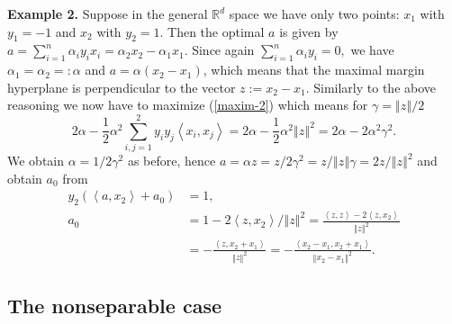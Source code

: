 \documentclass[11pt,twoside]{article}%
\theoremstyle{change}
\begin{document}
\textbf{Example 2.} Suppose in the general $\mathbb{R}^{d}$ space we have only
two points: $x_{1}$ with $y_{1}=-1$ and $x_{2}$ with $y_{2}=1$. Then the
optimal $a$ is given by $a=\sum_{i=1}^{n}\alpha_{i}y_{i}x_{i}=\alpha_{2}%
x_{2}-\alpha_{1}x_{1}$. Since again $\sum_{i=1}^{n}\alpha_{i}y_{i}=0,$ we have
$\alpha_{1}=\alpha_{2}=:\alpha$ and $a=\alpha\left(  x_{2}-x_{1}\right)  $,
which means that the maximal margin hyperplane is perpendicular to the vector
$z:=x_{2}-x_{1}$. Similarly to the above reasoning we now have to maximize
(\ref{maxim-2}) which means for $\gamma=\left\Vert z\right\Vert /2$
\[
2\alpha-\frac{1}{2}\alpha^{2}\sum_{i,j=1}^{2}y_{i}y_{j}\left\langle
x_{i},x_{j}\right\rangle =2\alpha-\frac{1}{2}\alpha^{2}\left\Vert z\right\Vert
^{2}=2\alpha-2\alpha^{2}\gamma^{2}.
\]
We obtain $\alpha=1/2\gamma^{2}$ as before, hence $a=\alpha z=z/2\gamma
^{2}=z/\left\Vert z\right\Vert \gamma=2z/\left\Vert z\right\Vert ^{2}$ and
obtain $a_{0}$ from
\begin{align*}
y_{2}\left(  \left\langle a,x_{2}\right\rangle +a_{0}\right)   & =1,\\
a_{0}  & =1-2\left\langle z,x_{2}\right\rangle /\left\Vert z\right\Vert
^{2}=\frac{\left\langle z,z\right\rangle -2\left\langle z,x_{2}\right\rangle
}{\left\Vert z\right\Vert ^{2}}\\
& =-\frac{\left\langle z,x_{2}+x_{1}\right\rangle }{\left\Vert z\right\Vert
^{2}}=-\frac{\left\langle x_{2}-x_{1},x_{2}+x_{1}\right\rangle }{\left\Vert
x_{2}-x_{1}\right\Vert ^{2}}.
\end{align*}


\subsection{The nonseparable case}
\end{document}

